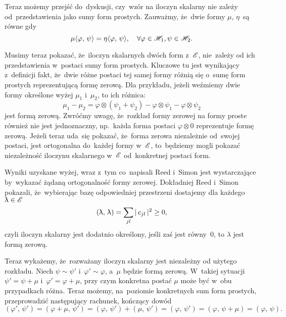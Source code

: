 \documentclass[a4paper,11pt]{article}
\begin{document}
Teraz możemy przejść do~dyskusji, czy~wzór na iloczyn skalarny nie
zależy od~przedstawienia jako sumy form prostych. Zauważmy, że~dwie
formy $\mu$, $\eta$~są równe gdy
\begin{equation}
  \label{eq:RS-Vol-I-s01-36}
  \mu\langle \varphi, \, \psi \rangle = \eta\langle \varphi, \, \psi \rangle, \quad
  \forall \varphi \in \mathcal{H}_{ 1 }, \psi \in \mathcal{H}_{ 2 }.
\end{equation}

Musimy teraz pokazać, że~iloczyn skalarnych dwóch form z~$\mathcal{E}$,
nie~zależy od ich przedstawienia w~postaci sumy form prostych.
Kluczowe tu jest wynikający z~definicji fakt, że~dwie różne postaci
tej samej formy różnią się o~sumę form prostych reprezentującą formę
zerową. Dla przykładu, jeżeli weźmiemy dwie formy określone wyżej
$\mu_{ 1 }$ i~$\mu_{ 2 }$, to ich różnica:
\begin{equation}
  \label{eq:RS-Vol-I-s01-37}
  \mu_{ 1 } - \mu_{ 2 } =
  \varphi \otimes ( \psi_{ 1 } + \psi_{ 2 } ) - \varphi \otimes \psi_{ 1 } - \varphi \otimes \psi_{ 2 }
\end{equation}
jest formą zerową. Zwróćmy uwagę, że~rozkład formy zerowej na formy
proste również nie jest jednoznaczny, np.~każda forma postaci
$\varphi \otimes 0$ reprezentuje formę zerową. Jeżeli teraz uda~się pokazać,
że~forma zerowa niezależnie od~swojej postaci, jest ortogonalna
do~każdej formy w~$\mathcal{E}$, to~będziemy mogli pokazać niezależność
iloczynu skalarnego w~$\mathcal{E}$ od~konkretnej postaci form.

Wyniki uzyskane wyżej, wraz z~tym co~napisali Reed i~Simon jest
wystarczające by~wykazać żądaną ortogonalność formy zerowej.
Dokładniej Reed i~Simon pokazali, że~wybierając bazę odpowiedniej
przestrzeni dostajemy dla każdego $\uplambda \in \mathcal{E}$
\begin{equation}
  \label{eq:RS-Vol-I-s01-38}
  ( \uplambda, \, \uplambda ) = \sum_{ j l } |\, {  c_{ j l }  } \,|^{ 2 } \geq 0,
\end{equation}
czyli iloczyn skalarny jest dodatnio określony, jeśli zaś jest
równy~0, to $\lambda$ jest formą zerową.

Teraz wykażemy, że~rozważany iloczyn skalarny jest niezależny od
użytego rozkładu. Niech $\psi \sim \psi'$ i~$\varphi' \sim \varphi$, a~$\mu$
będzie formą zerową. W~takiej sytuacji $\psi' = \psi + \mu$
i~$\varphi' = \varphi + \mu$, przy czym konkretna postać $\mu$ może być w~obu
przypadkach różna. Teraz możemy, na~poziomie konkretnych sum form
prostych, przeprowadzić następujący rachunek, kończący dowód
\begin{equation}
  \label{eq:RS-Vol-I-s01-39}
  ( \varphi', \, \psi' ) = ( \varphi + \mu, \, \psi' )
  = ( \varphi, \, \psi' ) + ( \mu, \, \psi' ) = ( \varphi, \, \psi' )
  = ( \varphi, \, \psi + \mu ) = ( \varphi, \, \psi ).
\end{equation}
\end{document}
